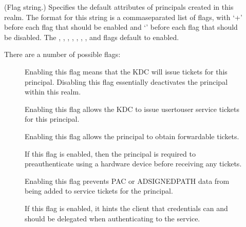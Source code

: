 \documentclass[letterpaper,10pt,english]{sphinxmanual}
\begin{document}
\begin{description}
\item[{}] \leavevmode
\sphinxAtStartPar
(Flag string.)  Specifies the default attributes of principals
created in this realm.  The format for this string is a
comma\sphinxhyphen{}separated list of flags, with ‘+’ before each flag that
should be enabled and ‘\sphinxhyphen{}’ before each flag that should be
disabled.  The , , ,
, , , , and
 flags default to enabled.

\sphinxAtStartPar
There are a number of possible flags:
\begin{description}
\item[{}] \leavevmode
\sphinxAtStartPar
Enabling this flag means that the KDC will issue tickets for
this principal.  Disabling this flag essentially deactivates
the principal within this realm.

\item[{}] \leavevmode
\sphinxAtStartPar
Enabling this flag allows the KDC to issue user\sphinxhyphen{}to\sphinxhyphen{}user
service tickets for this principal.

\item[{}] \leavevmode
\sphinxAtStartPar
Enabling this flag allows the principal to obtain forwardable
tickets.

\item[{}] \leavevmode
\sphinxAtStartPar
If this flag is enabled, then the principal is required to
preauthenticate using a hardware device before receiving any
tickets.

\item[{}] \leavevmode
\sphinxAtStartPar
Enabling this flag prevents PAC or AD\sphinxhyphen{}SIGNEDPATH data from
being added to service tickets for the principal.

\item[{}] \leavevmode
\sphinxAtStartPar
If this flag is enabled, it hints the client that credentials
can and should be delegated when authenticating to the
service.


\end{description}
\end{description}
\end{document}
